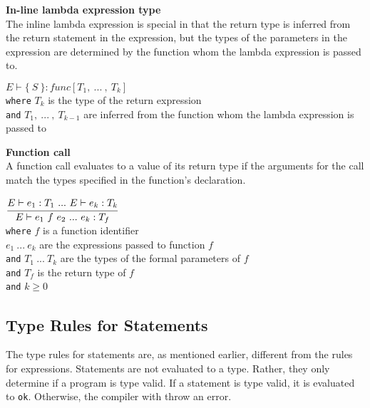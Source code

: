 \textbf{In-line lambda expression type}\\
The inline lambda expression is special in that the return type is inferred from the return statement in the expression, but the types of the parameters in the expression are determined by the function whom the lambda expression is passed to.

\begin{center}
	\begin{math}
	E \vdash \{\ S\ \} : func[T_1,\ .
	.
	.
	\ ,\ T_k]
	\end{math}
	\\[1\baselineskip]
	\texttt{where} $T_k$ is the type of the return expression\\
	\texttt{and} $T_1, \ .
	.
	.
	\ ,\ T_{k-1}$ are inferred from the function whom the lambda expression is passed to%
\end{center}

\textbf{Function call}\\
A function call evaluates to a value of its return type if the arguments for the call match the types specified in the function's declaration.

\begin{center}
	\begin{math}
		\cfrac
		{E \vdash e_1 : T_1 \ .
		.
		.
		\ E \vdash e_k : T_k}
		{E \vdash e_1\ f\ e_2 \ .
		.
		.
		\ e_k : T_f}
	\end{math}
	\\[1\baselineskip]
	\texttt{where} $f$ is a function identifier\\
	$e_1\ .
	.
	.
	\ e_k$ are the expressions passed to function $f$\\
	\texttt{and} $T_1\ .
	.
	.
	\ T_k$ are the types of the formal parameters of $f$\\
	\texttt{and} $T_f$ is the return type of $f$\\
	\texttt{and} $k \ge 0$
\end{center}



\subsection{Type Rules for Statements}
The type rules for statements are, as mentioned earlier, different from the rules for expressions.
Statements are not evaluated to a type.
Rather, they only determine if a program is type valid.
If a statement is type valid, it is evaluated to \texttt{ok}.
Otherwise, the compiler with throw an error.

